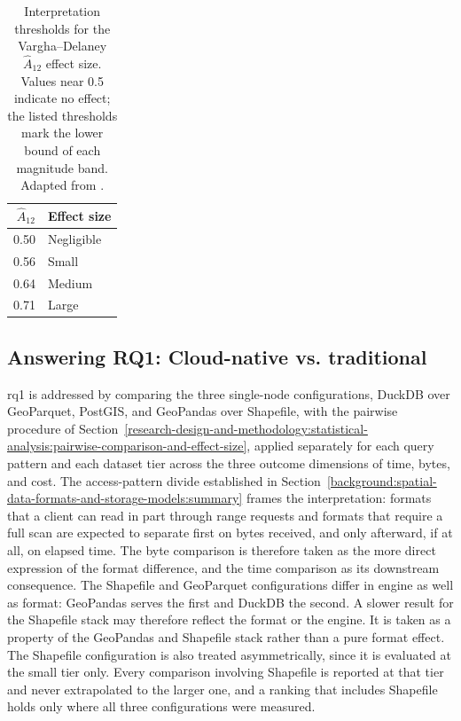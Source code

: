 \begin{table}[H]
	\centering
	\caption[Vargha--Delaney effect-size thresholds]{Interpretation thresholds for the Vargha--Delaney $\hat{A}_{12}$ effect size. Values near \num{0.5} indicate no effect; the listed thresholds mark the lower bound of each magnitude band. Adapted from \textcite{arcuri2014_hitchhiker_statistical_tests}.}
	\label{tab:vargha-delaney-thresholds}
	\begin{tabular}{@{}rl@{}}
		\toprule
		$\hat{A}_{12}$ & Effect size \\
		\midrule
		\num{0.50} & Negligible \\
		\num{0.56} & Small \\
		\num{0.64} & Medium \\
		\num{0.71} & Large \\
		\bottomrule
	\end{tabular}
\end{table}

\subsection{Answering RQ1: Cloud-native vs. traditional}
\label{research-design-and-methodology:statistical-analysis:answering-rq1-cloud-native-vs-traditional}

\acrshort{rq}1 is addressed by comparing the three single-node configurations, DuckDB over GeoParquet, PostGIS, and GeoPandas over Shapefile, with the pairwise procedure of Section~\ref{research-design-and-methodology:statistical-analysis:pairwise-comparison-and-effect-size}, applied separately for each query pattern and each dataset tier across the three outcome dimensions of time, bytes, and cost. The access-pattern divide established in Section~\ref{background:spatial-data-formats-and-storage-models:summary} frames the interpretation: formats that a client can read in part through range requests and formats that require a full scan are expected to separate first on bytes received, and only afterward, if at all, on elapsed time. The byte comparison is therefore taken as the more direct expression of the format difference, and the time comparison as its downstream consequence. The Shapefile and GeoParquet configurations differ in engine as well as format: GeoPandas serves the first and DuckDB the second. A slower result for the Shapefile stack may therefore reflect the format or the engine. It is taken as a property of the GeoPandas and Shapefile stack rather than a pure format effect. The Shapefile configuration is also treated asymmetrically, since it is evaluated at the small tier only. Every comparison involving Shapefile is reported at that tier and never extrapolated to the larger one, and a ranking that includes Shapefile holds only where all three configurations were measured.

